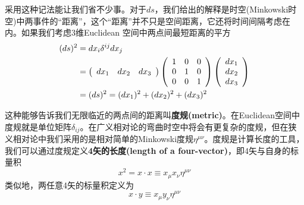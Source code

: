 采用这种记法能让我们省不少事。对于$ds$，我们给出的解释是时空(Minkowski时空)中两事件的“距离”，这个“距离”并不只是空间距离，它还将时间间隔考虑在内。如果我们考虑3维Euclidean 空间中两点间最短距离的平方
\begin{align}
  (ds)^2&=dx_i \delta^{ij} dx_j \notag \\
            &=\left(
               \begin{array}{ccc}
                dx_1 & dx_2 & dx_3 \\
               \end{array}
               \right)
               \left(
               \begin{array}{ccc}
                1 & 0 & 0  \\
                0 & 1 & 0  \\
                0 & 0 & 1  \\
              \end{array}
              \right)
              \left(
              \begin{array}{c}
               dx_1 \\
               dx_2 \\
               dx_3\\
              \end{array}
              \right)\notag \\
           &=(ds)^2=(dx_1)^2+(dx_2)^2+(dx_3)^2\label{equ2.27}
\end{align}

这种能够告诉我们无限临近的两点间的距离叫{\bf{度规(metric)}}。在Euclidean空间中度规就是单位矩阵$\delta_{ij}$。在广义相对论的弯曲时空中将会有更复杂的度规，但在狭义相对论中我们采用的是相对简单的Minkowski度规$\eta^{\mu\nu}$。度规是计算长度的工具，我们可以通过度规定义{\bf{4矢的长度(length of a four-vector)}}，即4矢与自身的标量积
\[
x^2=x \cdot x \equiv x_\mu x_\nu \eta^{\mu\nu}
\]
类似地，两任意4矢的标量积定义为
\begin{equation}\label{equ2.28}
  x\cdot y\equiv x_\mu y_\nu \eta^{\mu\nu}
\end{equation}

